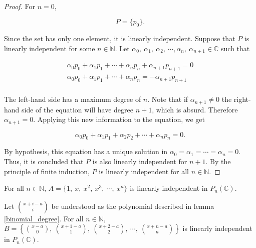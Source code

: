 \documentclass[12pt]{article}
\begin{document}
\begin{proof}

    For $n = 0$,

    $$
        P = \{ p_0 \}.
    $$

    Since the set has only one element, it is linearly independent. Suppose that $P$ is linearly independent for some $n \in \mathbb{N}$. Let $\alpha_0,\ \alpha_1,\ \alpha_2,\ \cdots, \alpha_n,\ \alpha_{n+1} \in \mathbb{C}$ such that

    \begin{align*}
        \alpha_0 p_0 + \alpha_1 p_1 + \cdots  + \alpha_n p_n + \alpha_{n+1} p_{n+1} = 0 \\
        \alpha_0 p_0 + \alpha_1 p_1 + \cdots  + \alpha_n p_n = -\alpha_{n+1} p_{n+1}    \\
    \end{align*}

    The left-hand side has a maximum degree of $n$. Note that if $\alpha_{n+1} \ne 0$ the right-hand side of the equation will have degree $n+1$, which is absurd. Therefore $\alpha_{n+1} = 0$. Applying this new information to the equation, we get

    $$
        \alpha_0 p_0 + \alpha_1 p_1 + \alpha_2 p_2 + \cdots + \alpha_n p_n = 0.
    $$

    By hypothesis, this equation has a unique solution in $\alpha_0 = \alpha_1 = \cdots = \alpha_n = 0$. Thus, it is concluded that $P$ is also linearly independent for $n+1$. By the principle of finite induction, $P$ is linearly independent for all $n \in \mathbb{N}$.

\end{proof}

\vspace{20px}

\begin{corollary}
    \label{simple_polynomial_li}
    For all $n \in \mathbb{N}$, $\displaystyle A = \{ 1,\ x,\ x^2,\ x^3,\ \cdots,\ x^n \}$ is linearly independent in $P_n(\mathbb{C})$.
\end{corollary}

\begin{corollary}
    \label{binomial_li}
    Let $\displaystyle \binom{x+i-a}{i}$ be understood as the polynomial described in lemma \ref{binomial_degree}. For all $n \in \mathbb{N}$, $\displaystyle B = \left\{ \binom{x-a}{0},\ \binom{x+1-a}{1},\ \binom{x+2-a}{2},\ \cdots ,\ \binom{x+n-a}{n} \right\}$ is linearly independent in $P_n(\mathbb{C})$.

\end{corollary}
\end{document}
